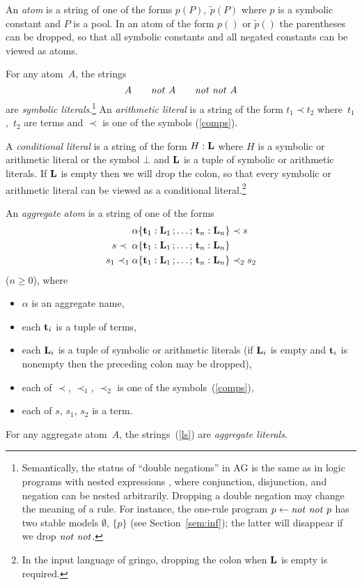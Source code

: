 \documentclass{tlp}
\def\ar{\leftarrow}
\def\beq{\begin{equation}}
\def\eeq#1{\label{#1}\end{equation}}
\def\no{{\it not}}
\begin{document}
An {\sl atom} is a string of one of the forms
$p(P),\ \tilde{p}(P)$
where $p$ is a symbolic constant and $P$ is a pool.
In an atom of the form $p()$ or $\tilde{p}()$ the parentheses can be 
dropped, so that all symbolic constants and all negated constants can be viewed 
as atoms. 

For any atom~$A$, the strings
\beq
A\qquad\no\ A\qquad\no\ \no\ A
\eeq{ls}
are {\sl symbolic literals}.\footnote{Semantically, the status of
``double negations'' in AG is the same as in logic programs with
nested expressions \cite{lif99d}, where conjunction, disjunction, and
negation can be nested arbitrarily.
Dropping a double negation may change the meaning of a rule.  For
instance, the one-rule program $p\ar \no\ \no\ p$ has two stable models
$\emptyset$, $\{p\}$ (see Section~\ref{sem:inf}); the latter will disappear
if we drop $\no\ \no$.} An {\sl arithmetic literal} is
a string of the form $t_1\prec t_2$ 
where~$t_1$,~$t_2$ are terms and $\prec$ is one of the symbols (\ref{comps}).

A {\sl conditional literal} is a string of the form
$H : {\bf L}$
where $H$ is a symbolic or arithmetic literal or the symbol $\bot$ and
${\bf L}$ is a tuple of symbolic or arithmetic literals.
If ${\bf L}$ is empty then we will drop the colon, so that every symbolic or 
arithmetic literal
can be viewed as a conditional literal.\footnote{In the input language of
{\sc gringo}, dropping the colon when ${\bf L}$ is empty is required.}

An {\sl aggregate atom} is a string of one of the forms
\begin{align}
       \alpha\{{\bf t}_1 : {\bf L}_1\,;\ldots;\,{\bf t}_n : {\bf L}_n\}&\prec s
\label{ag1}\\ 
s\prec\;\alpha\{{\bf t}_1 : {\bf L}_1\,;\ldots;\,{\bf t}_n : {\bf L}_n\}&
\label{ag2}\\
s_1\prec_1\alpha\{{\bf t}_1 : {\bf L}_1\,;\ldots;\,{\bf t}_n : {\bf L}_n\}&
                                                              \prec_2s_2
\label{ag3}
\end{align}
($n\geq 0$),
where
\begin{itemize}
\item
$\alpha$ is an aggregate name,
\item
each ${\bf t}_i$ is a tuple of terms,
\item
each ${\bf L}_i$ is a tuple of symbolic or arithmetic literals (if 
${\bf L}_i$ is empty and ${\bf t}_i$ is nonempty then the preceding colon may 
be dropped),
\item
each of $\prec$, $\prec_1$, $\prec_2$ is one of the
symbols~(\ref{comps}), 
\item
each of $s$, $s_1$, $s_2$  is a term.
\end{itemize}
For any aggregate atom~$A$, the strings~(\ref{ls})
are {\sl aggregate literals}.
\end{document}
